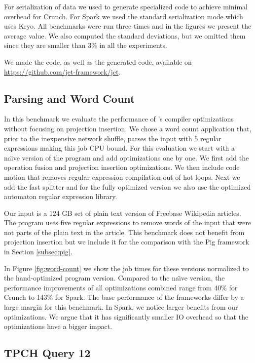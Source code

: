 For serialization of data we used \tool to generate specialized code to achieve minimal overhead for Crunch. 
For Spark we used the standard serialization mode which uses Kryo. All
benchmarks were run three times and in the figures we present the average
value. We also computed the standard deviations, but we omitted them since they
are smaller than 3\% in all the experiments.

We made the \tool code, as well as the generated code, available on
\url{https://github.com/jet-framework/jet}.


\subsection{Parsing and Word Count}
\label{subsec:parsing-word-count}

In this benchmark we evaluate the performance of \tool's compiler optimizations
without focusing on projection insertion. We chose a word count application
that, prior to the inexpensive network shuffle, parses the input with 5 regular
expressions making this job CPU bound. For this evaluation we start with a
 na\"{\i}ve version of the program and add optimizations one by one. We first add
the operation fusion and projection insertion optimizations. We then include
code motion that removes regular expression compilation out of hot loops. Next
we add the fast splitter and for the fully optimized version we also use the
optimized automaton regular expression library.

Our input is a 124 GB set of plain text version of Freebase Wikipedia articles.
The program uses five regular expressions to remove words of the input that were
not parts of the plain text in the article. This benchmark does not benefit from
projection insertion but we include it for the comparison
with the Pig framework in Section \ref{subsec:pig}.

In Figure \ref{fig:word-count} we show the job times for these versions
normalized to the hand-optimized program version. Compared to the na\"{\i}ve
version, the performance improvements of
all optimizations combined range from 40\% for Crunch
to 143\% for Spark. The base performance of the frameworks differ
by a large margin for this benchmark. In
Spark, we notice larger benefits from our optimizations. We argue that it has
significantly smaller IO overhead so that the optimizations have a bigger
impact. 

\subsection{TPCH Query 12}
\label{subsec:tpch-query-12}

